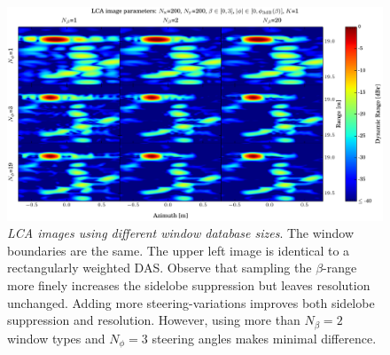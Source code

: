 \documentclass[10pt,journal,draftclsnofoot,onecolumn]{IEEEtran}
\let\MYoriglatexcaption\caption               %
\renewcommand{\caption}[2][\relax]{\MYoriglatexcaption[#2]{#2}}
\newcommand\1{\vec 1}
\providecommand{\DIFadd}[1]{{\protect\color{blue}\uwave{#1}}} %
\providecommand{\DIFdel}[1]{{\protect\color{red}\sout{#1}}}                      %
\providecommand{\DIFaddFL}[1]{\DIFadd{#1}} %
\providecommand{\DIFdelFL}[1]{\DIFdel{#1}} %
\providecommand{\DIFaddbeginFL}{} %
\providecommand{\DIFaddendFL}{} %
\providecommand{\DIFdelbeginFL}{} %
\providecommand{\DIFdelendFL}{} %
\begin{document}
\begin{figure}[t]%
\DIFdelbeginFL %
\DIFdelendFL \DIFaddbeginFL \includegraphics[width=\textwidth]{gfx/oversampling_mosaic.pdf}\DIFaddendFL %
\caption{\emph{LCA images using different window database sizes}. The window boundaries are the same. The upper left image is identical to a rectangularly weighted DAS. Observe that sampling the $\beta$-range more finely increases the sidelobe suppression but leaves resolution unchanged. Adding more steering-variations improves both sidelobe suppression and resolution. However, using more than  $N_\beta=2$ window types and \DIFdelbeginFL \DIFdelFL{$N_\phi=3$ }\DIFdelendFL \DIFaddbeginFL \DIFaddFL{$N_\beta=3$ }\DIFaddendFL steering angles makes minimal difference.}\label{oversampling_mosaic}
\end{figure}
\end{document}
